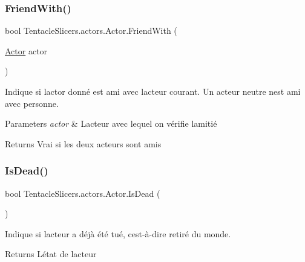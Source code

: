 \subsubsection{\texorpdfstring{Friend\+With()}{FriendWith()}}
{\footnotesize\ttfamily bool Tentacle\+Slicers.\+actors.\+Actor.\+Friend\+With (\begin{DoxyParamCaption}\item[{\hyperlink{class_tentacle_slicers_1_1actors_1_1_actor}{Actor}}]{actor }\end{DoxyParamCaption})}



Indique si l\textquotesingle{}actor donné est ami avec l\textquotesingle{}acteur courant. Un acteur neutre n\textquotesingle{}est ami avec personne. 


\begin{DoxyParams}{Parameters}
{\em actor} & L\textquotesingle{}acteur avec lequel on vérifie l\textquotesingle{}amitié \\
\hline
\end{DoxyParams}
\begin{DoxyReturn}{Returns}
Vrai si les deux acteurs sont amis 
\end{DoxyReturn}
\mbox{\label{class_tentacle_slicers_1_1actors_1_1_actor_a50dc47bc896ec330738ba8e810931ad3}} 
\subsubsection{\texorpdfstring{Is\+Dead()}{IsDead()}}
{\footnotesize\ttfamily bool Tentacle\+Slicers.\+actors.\+Actor.\+Is\+Dead (\begin{DoxyParamCaption}{ }\end{DoxyParamCaption})}



Indique si l\textquotesingle{}acteur a déjà été tué, c\textquotesingle{}est-\/à-\/dire retiré du monde. 

\begin{DoxyReturn}{Returns}
L\textquotesingle{}état de l\textquotesingle{}acteur 
\end{DoxyReturn}
\mbox{\label{class_tentacle_slicers_1_1actors_1_1_actor_afffc67c1b360fdf0f268469e7016acad}} 
